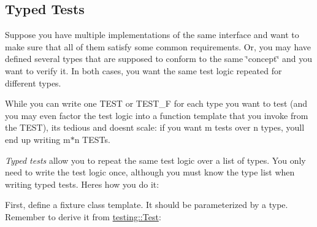 \begin{DoxyCode}{0}
\DoxyCodeLine{}
\DoxyCodeLine{\{}
\DoxyCodeLine{\}}
\DoxyCodeLine{}
\end{DoxyCode}


\subsection*{Typed Tests}

Suppose you have multiple implementations of the same interface and want to make sure that all of them satisfy some common requirements. Or, you may have defined several types that are supposed to conform to the same \char`\"{}concept\char`\"{} and you want to verify it. In both cases, you want the same test logic repeated for different types.

While you can write one {\ttfamily T\+E\+ST} or {\ttfamily T\+E\+S\+T\+\_\+F} for each type you want to test (and you may even factor the test logic into a function template that you invoke from the {\ttfamily T\+E\+ST}), it\textquotesingle{}s tedious and doesn\textquotesingle{}t scale\+: if you want {\ttfamily m} tests over {\ttfamily n} types, you\textquotesingle{}ll end up writing {\ttfamily m$\ast$n} {\ttfamily T\+E\+ST}s.

{\itshape Typed tests} allow you to repeat the same test logic over a list of types. You only need to write the test logic once, although you must know the type list when writing typed tests. Here\textquotesingle{}s how you do it\+:

First, define a fixture class template. It should be parameterized by a type. Remember to derive it from {\ttfamily \mbox{\hyperlink{classtesting_1_1Test}{testing\+::\+Test}}}\+:


\begin{DoxyCode}{0}
\DoxyCodeLine{\};}
\end{DoxyCode}



